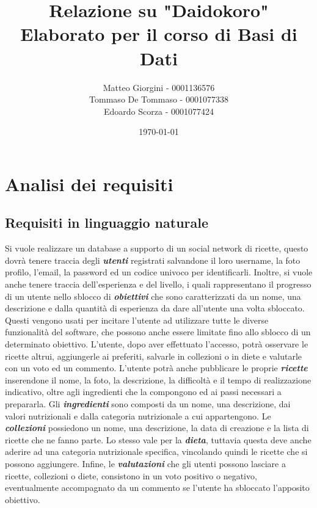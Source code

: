 ﻿\documentclass[a4paper,12pt]{report}
\title{Relazione su "Daidokoro" \\ Elaborato per il corso di Basi di Dati}
\author
{
    Matteo Giorgini - 0001136576 \\
    Tommaso De Tommaso - 0001077338 \\
    Edoardo Scorza - 0001077424 \\
}
\date{\today}
\begin{document}
\maketitle
\tableofcontents

\chapter{Analisi dei requisiti}
\section{Requisiti in linguaggio naturale}
Si vuole realizzare un database a supporto di un social network di ricette, questo dovrà tenere traccia degli \textbf{\textit{utenti}} registrati salvandone il loro username, la foto profilo, l'email, la password ed un codice univoco per identificarli.
Inoltre, si vuole anche tenere traccia dell'esperienza e del livello, i quali rappresentano il progresso di un utente nello sblocco di \textbf{\textit{obiettivi}} che sono caratterizzati da un nome, una descrizione e dalla quantità di esperienza da dare all'utente una volta sbloccato.
Questi vengono usati per incitare l'utente ad utilizzare tutte le diverse funzionalità del software, che possono anche essere limitate fino allo sblocco di un determinato obiettivo.
L'utente, dopo aver effettuato l'accesso, potrà osservare le ricette altrui, aggiungerle ai preferiti, salvarle in collezioni o in diete e valutarle con un voto ed un commento.
L'utente potrà anche pubblicare le proprie \textbf{\textit{ricette}} inserendone il nome, la foto, la descrizione, la difficoltà e il tempo di realizzazione indicativo, oltre agli ingredienti che la compongono ed ai passi necessari a prepararla.
Gli \textbf{\textit{ingredienti}} sono composti da un nome, una descrizione, dai valori nutrizionali e dalla categoria nutrizionale a cui appartengono.
Le \textbf{\textit{collezioni}} possiedono un nome, una descrizione, la data di creazione e la lista di ricette che ne fanno parte.
Lo stesso vale per la \textbf{\textit{dieta}}, tuttavia questa deve anche aderire ad una categoria nutrizionale specifica, vincolando quindi le ricette che si possono aggiungere.
Infine, le \textbf{\textit{valutazioni}} che gli utenti possono lasciare a ricette, collezioni o diete, consistono in un voto positivo o negativo, eventualmente accompagnato da un commento se l'utente ha sbloccato l'apposito obiettivo.
\\
\end{document}
